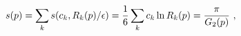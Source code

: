 \begin{equation}\label{3.31}
s(p)=\sum_k s(c_k,R_k(p)/\epsilon)=
{1 \over 6} \sum_k c_k \ln R_k(p)={\pi \over G_2(p)}~,
\end{equation}

